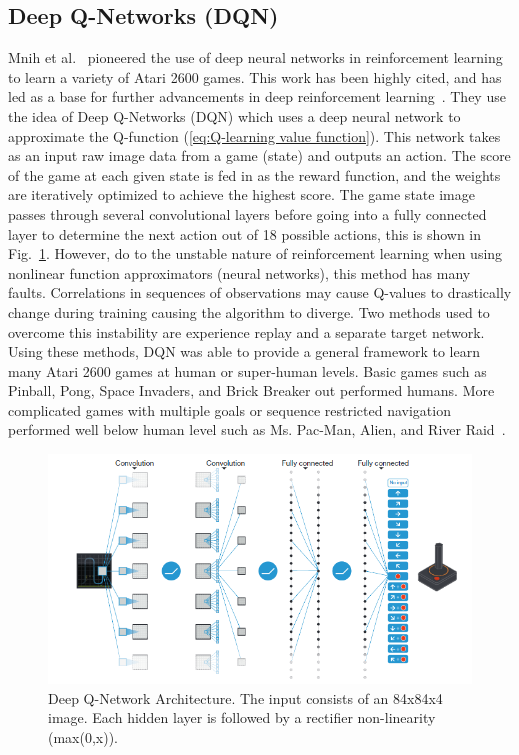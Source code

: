 \documentclass[12pt,american]{report}
\begin{document}
\subsection{Deep Q-Networks (DQN)}
\label{sec:dqn}
Mnih et al.~\cite{atari} pioneered the use of deep neural networks in reinforcement learning to learn a variety of Atari 2600 games.  This work has been highly cited, and has led as a base for further advancements in deep reinforcement learning~\cite{atari}.  They use the idea of Deep Q-Networks (DQN) which uses a deep neural network to approximate the Q-function (\ref{eq:Q-learning value function}). This network takes as an input raw image data from a game (state) and outputs an action. The score of the game at each given state is fed in as the reward function, and the weights are iteratively optimized to achieve the highest score. The game state image passes through several convolutional layers before going into a fully connected layer to determine the next action out of 18 possible actions, this is shown in Fig.~\ref{fig:DQN-atari}. However, do to the unstable nature of reinforcement learning when using nonlinear function approximators (neural networks), this method has many faults. Correlations in sequences of observations may cause Q-values to drastically change during training causing the algorithm to diverge. Two methods used to overcome this instability are experience replay and a separate target network. Using these methods, DQN was able to provide a general framework to learn many Atari 2600 games at human or super-human levels. Basic games such as Pinball, Pong, Space Invaders, and Brick Breaker out performed humans. More complicated games with multiple goals or sequence restricted navigation performed well below human level such as Ms. Pac-Man, Alien, and River Raid~\cite{atari}.

\begin{figure}
\centering
\includegraphics[scale=.95]{images/DQN-atari.png}
\caption{Deep Q-Network Architecture. The input consists of an 84x84x4 image. Each hidden layer is followed by a rectifier non-linearity (max(0,x)).~\cite{atari}}
\label{fig:DQN-atari}
\end{figure}
\end{document}
